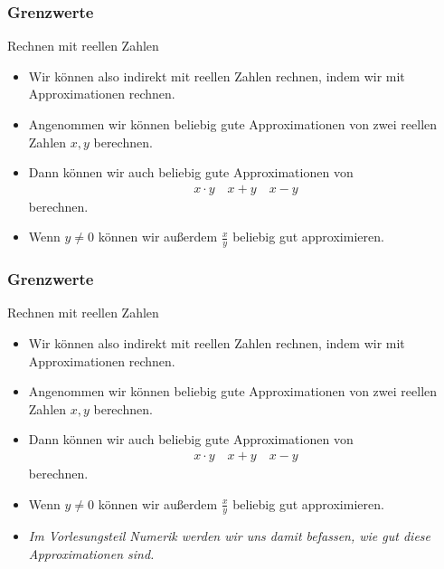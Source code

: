\documentclass{beamer}
\renewcommand{\emph}[1]{{\textcolor{solarizedRed}{\itshape #1}}}
\renewcommand{\oe}{\"o}
\newcommand{\mytitle}{Grenzwerte}
\begin{document}
\begin{frame}\frametitle{\mytitle}
	\begin{block}{Rechnen mit reellen Zahlen}
		\begin{itemize}
			\item Wir k\oe nnen also \alert{indirekt} mit reellen Zahlen rechnen, indem wir mit Approximationen rechnen.
			\item Angenommen wir k\oe nnen beliebig gute Approximationen von zwei reellen Zahlen $x,y$ berechnen.
			\item Dann k\oe nnen wir auch beliebig gute Approximationen von
				\begin{align*}
					x\cdot y\quad x+y\quad x-y
				\end{align*}
				berechnen.
			\item Wenn $y\neq0$ k\oe nnen wir au\ss erdem $\frac xy$ beliebig gut approximieren.
		\end{itemize}
	\end{block}
\end{frame}

\begin{frame}\frametitle{\mytitle}
	\begin{block}{Rechnen mit reellen Zahlen}
		\begin{itemize}
			\item Wir k\oe nnen also \alert{indirekt} mit reellen Zahlen rechnen, indem wir mit Approximationen rechnen.
			\item Angenommen wir k\oe nnen beliebig gute Approximationen von zwei reellen Zahlen $x,y$ berechnen.
			\item Dann k\oe nnen wir auch beliebig gute Approximationen von
				\begin{align*}
					x\cdot y\quad x+y\quad x-y
				\end{align*}
				berechnen.
			\item Wenn $y\neq0$ k\oe nnen wir au\ss erdem $\frac xy$ beliebig gut approximieren.
			\item \itshape Im Vorlesungsteil Numerik werden wir uns damit befassen, \emph{wie} gut diese Approximationen sind.
		\end{itemize}
	\end{block}
\end{frame}
\end{document}

